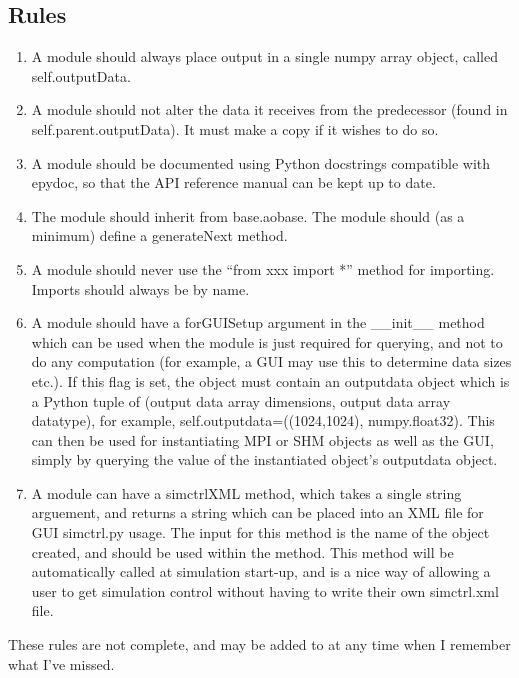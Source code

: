\documentclass{article}
\begin{document}
\subsection{Rules}
\begin{enumerate}
\item A module should always place output in a single numpy array
  object, called self.outputData.
\item A module should not alter the data it receives from the
  predecessor (found in self.parent.outputData).  It must make a copy
  if it wishes to do so.
\item A module should be documented using Python docstrings compatible
  with epydoc, so that the API reference manual can be kept up to
  date.
\item The module should inherit from base.aobase.  The module should
  (as a minimum) define a generateNext method.
\item A module should never use the ``from xxx import *'' method for
  importing.  Imports should always be by name.
\item A module should have a forGUISetup argument in the \_\_init\_\_
  method which can be used when the module is just required for
  querying, and not to do any computation (for example, a GUI may use
  this to determine data sizes etc.).  If this flag is set, the object
  must contain an outputdata object which is a Python tuple of (output
  data array dimensions, output data array datatype), for example,
  self.outputdata=((1024,1024), numpy.float32).  This can then be
  used for instantiating MPI or SHM objects as well as the GUI, simply
  by querying the value of the instantiated object's outputdata
  object.
\item A module can have a simctrlXML method, which takes a single
  string arguement, and returns a string which can be placed into an
  XML file for GUI simctrl.py usage.  The input for this method is the
  name of the object created, and should be used within the method.
  This method will be automatically called at simulation start-up, and
  is a nice way of allowing a user to get simulation control without
  having to write their own simctrl.xml file.
\end{enumerate}
These rules are not complete, and may be added to at any time when I
remember what I've missed.
\end{document}
